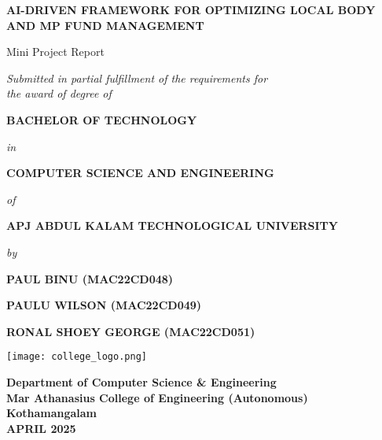 \documentclass[12pt,a4paper]{report}
\begin{document}
\begin{center}
    \textbf{\LARGE AI-DRIVEN FRAMEWORK FOR OPTIMIZING LOCAL BODY AND MP FUND MANAGEMENT} \\
    \vspace{12pt}
    
    Mini Project Report \\
    \vspace{12pt}
    
    \textit{Submitted in partial fulfillment of the requirements for \\ the award of degree of} \\
    \vspace{12pt}

    \textbf{BACHELOR OF TECHNOLOGY} \\
    \vspace{8pt}
    
    \textit{in} \\
    \vspace{8pt}
    
    \textbf{COMPUTER SCIENCE AND ENGINEERING} \\
    \vspace{8pt}
    
    \textit{of} \\
    \vspace{8pt}
    
    \textbf{APJ ABDUL KALAM TECHNOLOGICAL UNIVERSITY} \\
    \vspace{8pt}
    
    \textit{by} \\
    \vspace{8pt}

    \textbf{PAUL BINU (MAC22CD048)} \\  
    \vspace{8pt}
    
    \textbf{PAULU WILSON (MAC22CD049)} \\  
    \vspace{8pt}
    
    \textbf{RONAL SHOEY GEORGE (MAC22CD051)} \\  
    \vspace{8pt}

    \texttt{[image: college\_logo.png]}
    \vspace{8pt}

    \textbf{Department of Computer Science \& Engineering \\
    Mar Athanasius College of Engineering (Autonomous)\\
    Kothamangalam} \\
    \vspace{8pt}
    \textbf{APRIL 2025} \\
\thispagestyle{empty}
\end{center}
\end{document}
